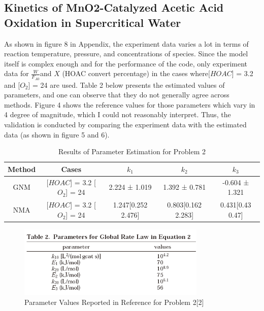 \documentclass[12pt]{article} %
\begin{document}
\subsection{Kinetics of MnO2-Catalyzed Acetic Acid Oxidation in Supercritical Water}
As shown in figure 8 in Appendix, the experiment data varies a lot in terms of reaction temperature, pressure, and concentrations of species. Since the model itself is complex enough and for the performance of the code,
only experiment data for $\frac{W}{F_{A0}} $and $X$ (HOAC convert percentage) in the cases where[$HOAC$] = 3.2 and [$O_2$] = 24 are used. Table 2 below presents the estimated values of parameters, and one can observe that
they do not generally agree across methods. Figure 4 shows the reference values for those parameters which vary in 4 degree of magnitude, which I could not reasonably interpret. Thus, the validation is conducted by comparing 
the experiment data with the estimated data (as shown in figure 5 and 6).
\begin{table}[ht]
    \caption{Results of Parameter Estimation for Problem 2}
    \centering
    \begin{tabular}{|c|c|c|c|c|}
    \hline
Method & Cases &$k_1$  & $k_2$ & $k_3$\\ \hline
GNM & [$HOAC$] = 3.2 [$O_2$] = 24& 2.224 ± 1.019& 1.392 ± 0.781 & -0.604 ± 1.321\\\hline
NMA & [$HOAC$] = 3.2 [$O_2$] = 24& 1.247[0.252  2.476]&  0.803[0.162 2.283]&  0.431[0.43  0.47]\\\hline 
\end{tabular}
\end{table}

\begin{figure}[ht]
    \centering
    \includegraphics[width=0.8\textwidth]{Q2_ref.png}
    \caption{Parameter Values Reported in Reference for Problem 2[2]}
\end{figure}
\end{document}
